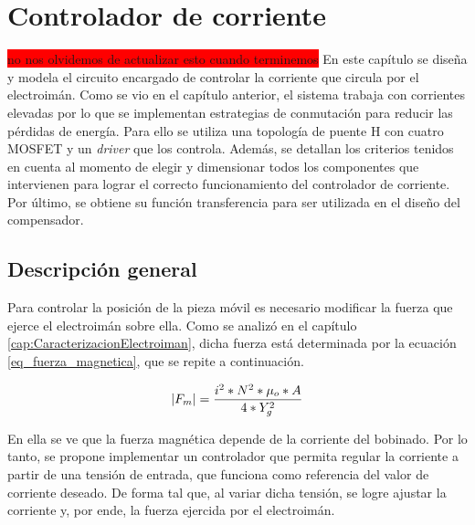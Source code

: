 \chapter{Controlador de corriente}  \label{cap:ControladorCorriente}
\colorbox{red}{no nos olvidemos de actualizar esto cuando terminemos}
En este capítulo se diseña y modela el circuito encargado de controlar la corriente que circula por el electroimán. Como se vio en el capítulo anterior, el sistema trabaja con corrientes elevadas por lo que se implementan estrategias de conmutación para reducir las pérdidas de energía. Para ello se utiliza una topología de puente H con cuatro MOSFET y un \textsl{driver} que los controla. Además, se detallan los criterios tenidos en cuenta al momento de  elegir  y dimensionar todos los componentes que intervienen para lograr el correcto funcionamiento del controlador de corriente. Por último, se obtiene su función transferencia  para ser utilizada en el diseño del compensador.

\section{Descripción general}\label{sec_descripcion-general}

Para controlar la posición de la pieza móvil es necesario modificar la fuerza que ejerce el electroimán sobre ella. Como se analizó en el capítulo \ref{cap:CaracterizacionElectroiman}, dicha fuerza está determinada por la ecuación \ref{eq_fuerza_magnetica}, que se repite a continuación. 

\begin{equation*}
	\lvert F_{m}\rvert=\frac{i^{2}*N^{2}*\mu_{o}*A}{4*Y_{g}^{2}}
\end{equation*}

En ella se ve que la fuerza magnética depende de la corriente del bobinado. Por lo tanto, se propone implementar un controlador que permita regular la corriente a partir de una tensión de entrada, que funciona como referencia del valor de corriente deseado. De forma tal que, al variar dicha tensión, se logre ajustar la corriente y, por ende, la fuerza ejercida por el electroimán.


